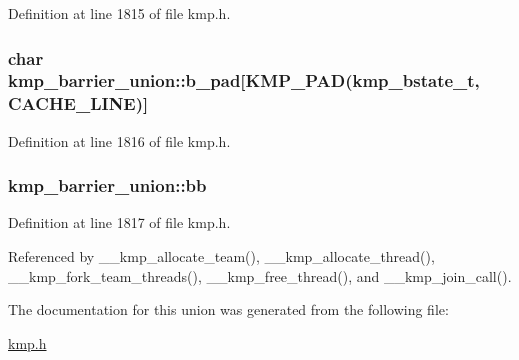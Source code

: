 Definition at line 1815 of file kmp.\-h.

\hypertarget{unionkmp__barrier__union_a1b1194e8d7ad8ae3239c745ded63301a}{
\subsubsection[{b\-\_\-pad}]{\setlength{\rightskip}{0pt plus 5cm}char kmp\-\_\-barrier\-\_\-union\-::b\-\_\-pad\mbox{[}{\bf K\-M\-P\-\_\-\-P\-A\-D}({\bf kmp\-\_\-bstate\-\_\-t}, {\bf C\-A\-C\-H\-E\-\_\-\-L\-I\-N\-E})\mbox{]}}}\label{unionkmp__barrier__union_a1b1194e8d7ad8ae3239c745ded63301a}


Definition at line 1816 of file kmp.\-h.

\hypertarget{unionkmp__barrier__union_ae01f3b4d1f256f9ec18b0528587bcceb}{
\subsubsection[{bb}]{ kmp\-\_\-barrier\-\_\-union\-::bb}}\label{unionkmp__barrier__union_ae01f3b4d1f256f9ec18b0528587bcceb}


Definition at line 1817 of file kmp.\-h.



Referenced by \-\_\-\-\_\-kmp\-\_\-allocate\-\_\-team(), \-\_\-\-\_\-kmp\-\_\-allocate\-\_\-thread(), \-\_\-\-\_\-kmp\-\_\-fork\-\_\-team\-\_\-threads(), \-\_\-\-\_\-kmp\-\_\-free\-\_\-thread(), and \-\_\-\-\_\-kmp\-\_\-join\-\_\-call().



The documentation for this union was generated from the following file\-:\begin{DoxyCompactItemize}
\item 
\hyperlink{kmp_8h}{kmp.\-h}\end{DoxyCompactItemize}
